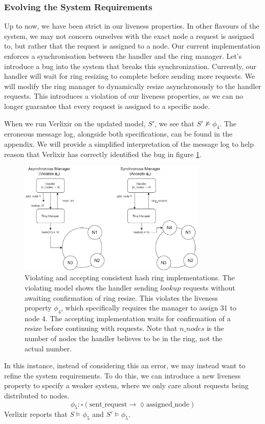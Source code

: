 \subsubsection{Evolving the System Requirements}
Up to now, we have been strict in our liveness properties. In other flavours of the system, we may not concern ourselves with the exact node a request is assigned to, but rather that the request is assigned to a node. Our current implementation enforces a synchronisation between the handler and the ring manager. Let's introduce a bug into the system that breaks this synchronization. Currently, our handler will wait for ring resizing to complete before sending more requests. We will modify the ring manager to dynamically resize asynchronously to the handler requests. This introduces a violation of our liveness properties, as we can no longer guarantee that every request is assigned to a specific node. 
\par
When we run Verlixir on the updated model, $S'$, we see that $S' \not\models \phi_4$. The erroneous message log, alongside both specifications, can be found in the appendix. We will provide a simplified interpretation of the message log to help reason that Verlixir has correctly identified the bug in figure \ref{fig:dht}.
\par
\begin{figure}[h]
    \centering
    \includegraphics[width=0.8\textwidth]{images/dht.png}
    \caption{Violating and accepting consistent hash ring implementations. The violating model shows the handler sending $lookup$ requests without awaiting confirmation of ring resize. This violates the liveness property $\phi_4$, which specifically requires the manager to assign $31$ to node $4$. The accepting implementation waits for confirmation of a resize before continuing with requests. Note that $n\_nodes$ is the number of nodes the handler believes to be in the ring, not the actual number.}
    \label{fig:dht}
\end{figure}
\par
In this instance, instead of considering this an error, we may instead want to refine the system requirements. To do this, we can introduce a new liveness property to specify a weaker system, where we only care about requests being distributed to nodes.
\[
\phi_5: \square (\text{sent\_request} \rightarrow \lozenge \text{assigned\_node})
\]
Verlixir reports that $S \models \phi_5$ and $S' \models \phi_5$.
